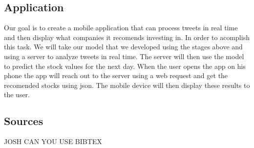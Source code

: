 \documentclass{acm_proc_article-sp}
\begin{document}
\subsection{Application}

Our goal is to create a mobile application that can process tweets in real time
and then display what companies it recomends investing in. In order to
acomplish this task. We will take our model that we developed using the stages
above and using a server to analyze tweets in real time. The server will then
use the model to predict the stock values for the next day. When the user opens
the app on his phone the app will reach out to the server using a web request
and get the recomended stocks using json. The mobile device will then display
these results to the user.

\subsection{Sources}

JOSH CAN YOU USE BIBTEX

 
\end{document}
